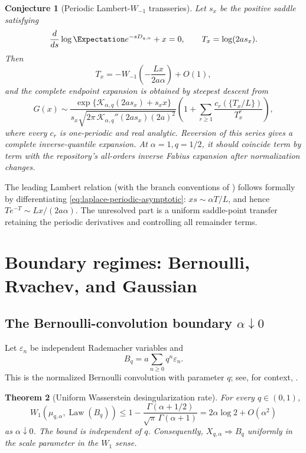 \documentclass[11pt]{article}
\newtheorem{theorem}{Theorem}[section]
\newtheorem{conjecture}[theorem]{Conjecture}
\theoremstyle{definition}
\theoremstyle{remark}
\newcommand{\Kcal}{\mathcal{K}}
\newcommand{\Wm}{W_{-1}}
\begin{document}
\begin{conjecture}[Periodic Lambert-\(W_{-1}\) transseries]
\label{conj:lambert-transseries}
Let \(s_x\) be the positive saddle satisfying
\[
 \frac{d}{ds}\log\Expectation e^{-sD_{q,\alpha}}+x=0,
 \qquad T_x=\log(2as_x).
\]
Then
\begin{equation}
 T_x=-\Wm\!\left(-\frac{Lx}{2a\alpha}\right)+O(1),
 \label{eq:Lambert-leading-saddle}
\end{equation}
and the complete endpoint expansion is obtained by steepest descent from
\begin{equation}
 G(x)\sim
 \frac{\exp\{\Kcal_{\alpha,q}(2as_x)+s_xx\}}
 {s_x\sqrt{2\pi\,\Kcal_{\alpha,q}''(2as_x)(2a)^2}}
 \left(1+\sum_{r\ge1}\frac{c_r(\{T_x/L\})}{T_x^r}\right),
 \label{eq:conjectural-saddle-expansion}
\end{equation}
where every \(c_r\) is one-periodic and real analytic.  Reversion of this
series gives a complete inverse-quantile expansion.  At \(\alpha=1,q=1/2\),
it should coincide term by term with the repository's all-orders inverse
Fabius expansion after normalization changes.
\end{conjecture}

The leading Lambert relation (with the branch conventions of \cite{CorlessLambert}) follows formally by differentiating
\eqref{eq:laplace-periodic-asymptotic}: \(xs\sim\alpha T/L\), and hence
\(Te^{-T}\sim Lx/(2a\alpha)\).  The unresolved part is a uniform saddle-point
transfer retaining the periodic derivatives and controlling all remainder
terms.

\section{Boundary regimes: Bernoulli, Rvachev, and Gaussian}
\label{sec:boundary-regimes}

\subsection{The Bernoulli-convolution boundary \(\alpha\downarrow0\)}

Let \(\varepsilon_n\) be independent Rademacher variables and
\begin{equation}
 B_q=a\sum_{n\ge0}q^n\varepsilon_n.
 \label{eq:bernoulli-convolution}
\end{equation}
This is the normalized Bernoulli convolution with parameter \(q\); see, for context, \cite{PeresSolomyak,Hochman,Shmerkin}.

\begin{theorem}[Uniform Wasserstein desingularization rate]
\label{thm:W1-boundary}
For every \(q\in(0,1)\),
\begin{equation}
 W_1(\mu_{q,\alpha},\operatorname{Law}(B_q))
 \le 1-\frac{\Gamma(\alpha+1/2)}{\sqrt\pi\,\Gamma(\alpha+1)}
 =2\alpha\log2+O(\alpha^2)
 \label{eq:W1-bound}
\end{equation}
as \(\alpha\downarrow0\).  The bound is independent of \(q\).
Consequently, \(X_{q,\alpha}\Rightarrow B_q\) uniformly in the scale
parameter in the \(W_1\) sense.
\end{theorem}
\end{document}

